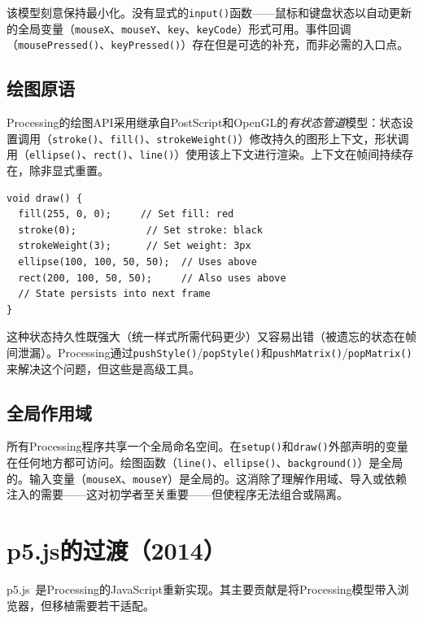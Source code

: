 \documentclass[10pt,letterpaper,twocolumn]{article}
\begin{document}
该模型刻意保持最小化。没有显式的\texttt{input()}函数——鼠标和键盘状态以自动更新的全局变量（\texttt{mouseX}、\texttt{mouseY}、\texttt{key}、\texttt{keyCode}）形式可用。事件回调（\texttt{mousePressed()}、\texttt{keyPressed()}）存在但是可选的补充，而非必需的入口点。

\subsection{绘图原语}

Processing的绘图API采用继承自PostScript和OpenGL的\emph{有状态管道}模型：状态设置调用（\texttt{stroke()}、\texttt{fill()}、\texttt{strokeWeight()}）修改持久的图形上下文，形状调用（\texttt{ellipse()}、\texttt{rect()}、\texttt{line()}）使用该上下文进行渲染。上下文在帧间持续存在，除非显式重置。

\begin{lstlisting}[style=processingstyle,caption={有状态绘图上下文。}]
void draw() {
  fill(255, 0, 0);     // Set fill: red
  stroke(0);            // Set stroke: black
  strokeWeight(3);      // Set weight: 3px
  ellipse(100, 100, 50, 50);  // Uses above
  rect(200, 100, 50, 50);     // Also uses above
  // State persists into next frame
}
\end{lstlisting}

这种状态持久性既强大（统一样式所需代码更少）又容易出错（被遗忘的状态在帧间泄漏）。Processing通过\texttt{pushStyle()}/\texttt{popStyle()}和\texttt{pushMatrix()}/\texttt{popMatrix()}来解决这个问题，但这些是高级工具。

\subsection{全局作用域}

所有Processing程序共享一个全局命名空间。在\texttt{setup()}和\texttt{draw()}外部声明的变量在任何地方都可访问。绘图函数（\texttt{line()}、\texttt{ellipse()}、\texttt{background()}）是全局的。输入变量（\texttt{mouseX}、\texttt{mouseY}）是全局的。这消除了理解作用域、导入或依赖注入的需要——这对初学者至关重要——但使程序无法组合或隔离。


\section{p5.js的过渡（2014）}
\label{sec:p5js}

p5.js~\citep{mccarthy2015p5js}是Processing的JavaScript重新实现。其主要贡献是将Processing模型带入浏览器，但移植需要若干适配。
\end{document}
